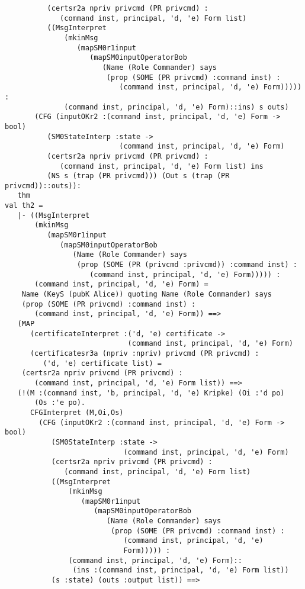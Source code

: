 \documentclass{report}
\begin{document}
\begin{session}
\begin{scriptsize}
\begin{verbatim}
          (certsr2a npriv privcmd (PR privcmd) :
             (command inst, principal, 'd, 'e) Form list)
          ((MsgInterpret
              (mkinMsg
                 (mapSM0r1input
                    (mapSM0inputOperatorBob
                       (Name (Role Commander) says
                        (prop (SOME (PR privcmd) :command inst) :
                           (command inst, principal, 'd, 'e) Form))))) :
              (command inst, principal, 'd, 'e) Form)::ins) s outs)
       (CFG (inputOKr2 :(command inst, principal, 'd, 'e) Form -> bool)
          (SM0StateInterp :state ->
                           (command inst, principal, 'd, 'e) Form)
          (certsr2a npriv privcmd (PR privcmd) :
             (command inst, principal, 'd, 'e) Form list) ins
          (NS s (trap (PR privcmd))) (Out s (trap (PR privcmd))::outs)):
   thm
val th2 =
   |- ((MsgInterpret
       (mkinMsg
          (mapSM0r1input
             (mapSM0inputOperatorBob
                (Name (Role Commander) says
                 (prop (SOME (PR (privcmd :privcmd)) :command inst) :
                    (command inst, principal, 'd, 'e) Form))))) :
       (command inst, principal, 'd, 'e) Form) =
    Name (KeyS (pubK Alice)) quoting Name (Role Commander) says
    (prop (SOME (PR privcmd) :command inst) :
       (command inst, principal, 'd, 'e) Form)) ==>
   (MAP
      (certificateInterpret :('d, 'e) certificate ->
                             (command inst, principal, 'd, 'e) Form)
      (certificatesr3a (npriv :npriv) privcmd (PR privcmd) :
         ('d, 'e) certificate list) =
    (certsr2a npriv privcmd (PR privcmd) :
       (command inst, principal, 'd, 'e) Form list)) ==>
   (!(M :(command inst, 'b, principal, 'd, 'e) Kripke) (Oi :'d po)
       (Os :'e po).
      CFGInterpret (M,Oi,Os)
        (CFG (inputOKr2 :(command inst, principal, 'd, 'e) Form -> bool)
           (SM0StateInterp :state ->
                            (command inst, principal, 'd, 'e) Form)
           (certsr2a npriv privcmd (PR privcmd) :
              (command inst, principal, 'd, 'e) Form list)
           ((MsgInterpret
               (mkinMsg
                  (mapSM0r1input
                     (mapSM0inputOperatorBob
                        (Name (Role Commander) says
                         (prop (SOME (PR privcmd) :command inst) :
                            (command inst, principal, 'd, 'e)
                            Form))))) :
               (command inst, principal, 'd, 'e) Form)::
                (ins :(command inst, principal, 'd, 'e) Form list))
           (s :state) (outs :output list)) ==>

\end{verbatim}
\end{scriptsize}
\end{session}
\end{document}
